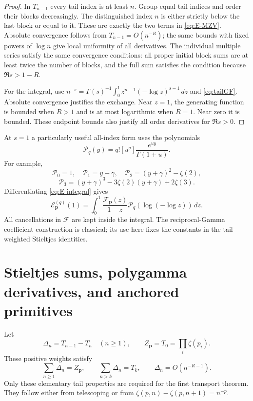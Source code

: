 \documentclass[11pt,letterpaper]{article}
\numberwithin{equation}{section}
\theoremstyle{definition}\newtheorem{definition}[theorem]{Definition}
\theoremstyle{remark}\newtheorem{remark}[theorem]{Remark}
\newcommand{\dd}{\,d}
\begin{document}
\begin{proof}
In $T_{n-1}$ every tail index is at least $n$. Group equal tail
indices and order their blocks decreasingly. The distinguished
index $n$ is either strictly below the last block or equal to it.
These are exactly the two terms in \eqref{eq:E-MZV}. Absolute
convergence follows from $T_{n-1}=O(n^{-R})$; the same bounds with
fixed powers of $\log n$ give local uniformity of all derivatives.
The individual multiple series satisfy the same convergence
conditions: all proper initial block sums are at least twice
the number of blocks, and the full sum satisfies the condition
because $\Re s>1-R$.

For the integral, use
$n^{-s}=\Gamma(s)^{-1}\int_0^1z^{n-1}(-\log z)^{s-1}\dd z$
and \eqref{eq:tailGF}. Absolute convergence justifies the exchange.
Near $z=1$, the generating function is bounded when $R>1$ and
is at most logarithmic when $R=1$. Near zero it is bounded.
These endpoint bounds also justify all order derivatives for
$\Re s>0$.
\end{proof}

At $s=1$ a particularly useful all-index form uses the polynomials
\begin{equation}\label{eq:Gamma-Appell}
 \mathscr P_q(y)=q![u^q]\frac{e^{uy}}{\Gamma(1+u)}.
\end{equation}
For example,
\[
 \mathscr P_0=1,\quad \mathscr P_1=y+\gamma,\quad
 \mathscr P_2=(y+\gamma)^2-\zeta(2),
\]
\[
 \mathscr P_3=(y+\gamma)^3-3\zeta(2)(y+\gamma)+2\zeta(3).
\]
Differentiating \eqref{eq:E-integral} gives
\begin{equation}\label{eq:E-jets}
 \mathcal E_{\boldsymbol p}^{(q)}(1)=
 \int_0^1\frac{\mathcal F_{\boldsymbol p}(z)}{1-z}
                         \mathscr P_q(\log(-\log z))\dd z.
\end{equation}
All cancellations in $\mathcal F$ are kept inside the integral.
The reciprocal-Gamma coefficient construction is classical; its
use here fixes the constants in the tail-weighted Stieltjes identities.

\section{Stieltjes sums, polygamma derivatives, and anchored primitives}
\label{sec:transport}

Let
\begin{equation}\label{eq:Delta}
 \Delta_n=T_{n-1}-T_n\quad(n\ge1),\qquad
 Z_{\boldsymbol p}=T_0=\prod_i\zeta(p_i).
\end{equation}
These positive weights satisfy
\begin{equation}\label{eq:Delta-properties}
 \sum_{n\ge1}\Delta_n=Z_{\boldsymbol p},\qquad
 \sum_{n>k}\Delta_n=T_k,\qquad
 \Delta_n=O(n^{-R-1}).
\end{equation}
Only these elementary tail properties are required for the first
transport theorem. They follow either from telescoping or from
$\zeta(p,n)-\zeta(p,n+1)=n^{-p}$.
\end{document}
